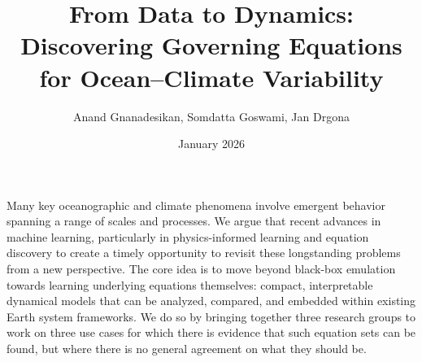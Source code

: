 \documentclass{article}
\title{From Data to Dynamics: Discovering Governing Equations for Ocean–Climate Variability}
\author{Anand Gnanadesikan, Somdatta Goswami, Jan Drgona}
\date{January 2026}
\begin{document}
\maketitle

Many key oceanographic and climate phenomena involve emergent behavior spanning a range of scales and processes. We argue that recent advances in machine learning, particularly in physics-informed learning and equation discovery to create a timely opportunity to revisit these longstanding problems from a new perspective. The core idea is to move beyond black-box emulation towards learning underlying equations themselves: compact, interpretable dynamical models that can be analyzed, compared, and embedded within existing Earth system frameworks. We do so by bringing together three research groups to work on three use cases for which there is evidence that such equation sets can be found, but where there is no general agreement on what they should be.
\end{document}
